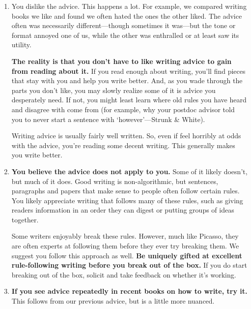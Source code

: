 \documentclass[11pt,letter]{article}
\begin{document}
\begin{enumerate}
\item You dislike the advice. This happens a lot. For example, we compared writing books we like and found we often hated the ones the other liked. The advice often was necessarily different---though sometimes it was---but the tone or format annoyed one of us, while the other was enthralled or at least saw its utility. 

{\bf The reality is that you don't have to like writing advice to gain from reading about it.} If you read enough about writing, you'll find pieces that stay with you and help you write better. And, as you wade through the parts you don't like, you may slowly realize some of it is advice you desperately need. If not, you might least learn where old rules you have heard and disagree with come from (for example, why your postdoc advisor told you to never start a sentence with `however'---Strunk \& White). 

Writing advice is usually fairly well written. So, even if feel horribly at odds with the advice, you're reading some decent writing. This generally makes you write better. 
\item {\bf You believe the advice does not apply to you.} Some of it likely doesn't, but much of it does. Good writing is non-algorithmic, but sentences, paragraphs and papers that make sense to people often follow certain rules. You likely appreciate writing that follows many of these rules, such as giving readers information in an order they can digest or putting groups of ideas together. 

Some writers enjoyably break these rules. However, much like Picasso, they are often experts at following them before they ever try breaking them. We suggest you follow this approach as well. {\bf Be uniquely gifted at excellent rule-following writing before you break out of the box.} If you do start breaking out of the box, solicit and take feedback on whether it's working. 
\item {\bf If you see advice repeatedly in recent books on how to write, try it.} This follows from our previous advice, but is a little more nuanced. 


\end{enumerate}
\end{document}
